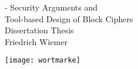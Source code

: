 %
%
%

\thispagestyle{empty}
{
    \calccentering{\unitlength}
    \begin{adjustwidth*}{\unitlength}{-\unitlength}
        \raggedleft{}
        {\Huge\color{Burgundy}%
        Security Arguments and\\
        Tool-based Design of Block Ciphers}\\[\baselineskip]
        {\LARGE%
        Dissertation Thesis}\\[0.2\textheight]
        {\huge%
        Friedrich Wiemer}\par
        \vfill
        {\texttt{[image: wortmarke]}}
        \vspace*{\baselineskip}
    \end{adjustwidth*}
}

\clearpage{}

\cleardoublepage{}

